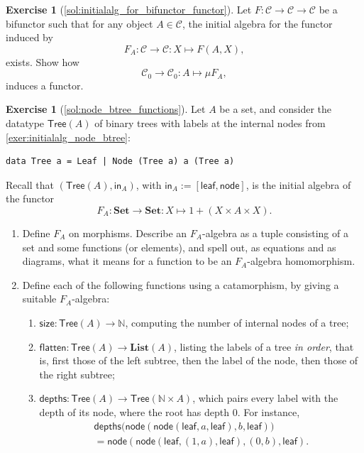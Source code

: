 \documentclass[a4paper,11pt, oneside,titlepage=false]{scrbook}
\theoremstyle{plain}
\theoremstyle{definition}
\newtheorem{exer}[thm]{Exercise}
\newcommand{\Cat}[1]{\mathcal{#1}}
\newcommand{\CC}{\Cat{C}}
\newcommand{\Catb}[1]{\mathbf{#1}}
\newcommand{\List}{\Catb{List}}
\newcommand{\SET}{\Catb{Set}}
\newcommand{\Ob}[1]{{#1}_0}
\newcommand{\In}{\ensuremath{\mathsf{in}}}
\newcommand{\NN}{\ensuremath{\mathbb{N}}}
\begin{document}
\begin{exer}[\cref{sol:initialalg_for_bifunctor_functor}]\label{exer:initialalg_for_bifunctor_functor} Let $F:\CC\to\CC\to\CC$ be a bifunctor such that for any object $A\in\CC$, the initial algebra for the functor induced by
\[
F_A : \CC\to\CC : X\mapsto F(A,X),
\]
exists. Show how
\[
\Ob{\CC} \to \Ob{\CC} : A\mapsto \mu F_A ,
\]
induces a functor.
\end{exer}



\begin{exer}[\cref{sol:node_btree_functions}]\label{exer:node_btree_functions}
  Let $A$ be a set, and consider the datatype $\mathsf{Tree}(A)$ of binary trees with labels at the internal nodes from \cref{exer:initialalg_node_btree}:
\begin{lstlisting}
data Tree a = Leaf | Node (Tree a) a (Tree a)
\end{lstlisting}
  Recall that $(\mathsf{Tree}(A), \In_A)$, with $\In_A := [\mathsf{leaf}, \mathsf{node}]$, is the initial algebra of the functor
  \[ F_A : \SET \to \SET : X \mapsto 1 + (X \times A \times X). \]
  \begin{enumerate}
  \item \label{enum:tree-alg}
    Define $F_A$ on morphisms.
    Describe an $F_A$-algebra as a tuple consisting of a set and some functions (or elements), and spell out, as equations and as diagrams, what it means for a function to be an $F_A$-algebra homomorphism.
  \item \label{enum:tree-catas}
    Define each of the following functions using a catamorphism, by giving a suitable $F_A$-algebra:
    \begin{enumerate}
    \item $\mathsf{size} : \mathsf{Tree}(A) \to \NN$, computing the number of internal nodes of a tree;
    \item $\mathsf{flatten} : \mathsf{Tree}(A) \to \List(A)$, listing the labels of a tree \emph{in order}, that is, first those of the left subtree, then the label of the node, then those of the right subtree;
    \item $\mathsf{depths} : \mathsf{Tree}(A) \to \mathsf{Tree}(\NN \times A)$, which pairs every label with the depth of its node, where the root has depth $0$.
      For instance,
      \begin{multline*}
        \mathsf{depths}\big(\mathsf{node}(\mathsf{node}(\mathsf{leaf}, a, \mathsf{leaf}), b, \mathsf{leaf})\big) \\
        = \mathsf{node}(\mathsf{node}(\mathsf{leaf}, (1,a), \mathsf{leaf}), (0,b), \mathsf{leaf}).

\end{multline*}
\end{enumerate}
\end{enumerate}
\end{exer}
\end{document}
